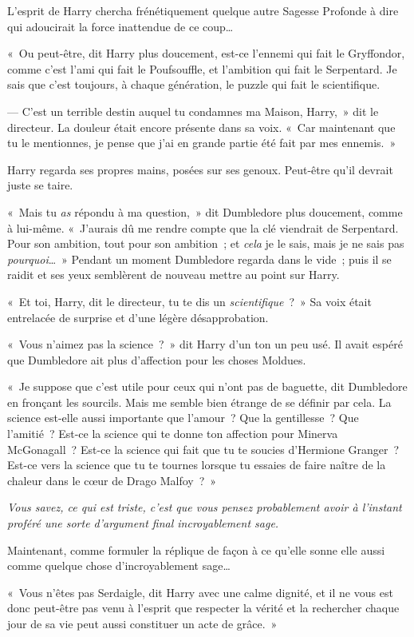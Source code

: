 L'esprit de Harry chercha frénétiquement quelque autre Sagesse Profonde à dire qui adoucirait la force inattendue de ce coup…

«~Ou peut-être, dit Harry plus doucement, est-ce l'ennemi qui fait le Gryffondor, comme c'est l'ami qui fait le Poufsouffle, et l'ambition qui fait le Serpentard. Je sais que c'est toujours, à chaque génération, le puzzle qui fait le scientifique.

--- C'est un terrible destin auquel tu condamnes ma Maison, Harry,~» dit le directeur. La douleur était encore présente dans sa voix. «~Car maintenant que tu le mentionnes, je pense que j'ai en grande partie été fait par mes ennemis.~»

Harry regarda ses propres mains, posées sur ses genoux. Peut-être qu'il devrait juste se taire.

«~Mais tu \emph{as} répondu à ma question,~» dit Dumbledore plus doucement, comme à lui-même. «~J'aurais dû me rendre compte que la clé viendrait de Serpentard. Pour son ambition, tout pour son ambition~; et \emph{cela} je le sais, mais je ne sais pas \emph{pourquoi}…~» Pendant un moment Dumbledore regarda dans le vide~; puis il se raidit et ses yeux semblèrent de nouveau mettre au point sur Harry.

«~Et toi, Harry, dit le directeur, tu te dis un \emph{scientifique}~?~» Sa voix était entrelacée de surprise et d'une légère désapprobation.

«~Vous n'aimez pas la science~?~» dit Harry d'un ton un peu usé. Il avait espéré que Dumbledore ait plus d'affection pour les choses Moldues.

«~Je suppose que c'est utile pour ceux qui n'ont pas de baguette, dit Dumbledore en fronçant les sourcils. Mais me semble bien étrange de se définir par cela. La science est-elle aussi importante que l'amour~? Que la gentillesse~? Que l'amitié~? Est-ce la science qui te donne ton affection pour Minerva McGonagall~? Est-ce la science qui fait que tu te soucies d'Hermione Granger~? Est-ce vers la science que tu te tournes lorsque tu essaies de faire naître de la chaleur dans le cœur de Drago Malfoy~?~»

\emph{Vous savez, ce qui est triste, c'est que vous pensez probablement avoir à l'instant proféré une sorte d'argument final incroyablement sage.}

Maintenant, comme formuler la réplique de façon à ce qu'elle sonne elle aussi comme quelque chose d'incroyablement sage…

«~Vous n'êtes pas Serdaigle, dit Harry avec une calme dignité, et il ne vous est donc peut-être pas venu à l'esprit que respecter la vérité et la rechercher chaque jour de sa vie peut aussi constituer un acte de grâce.~»

